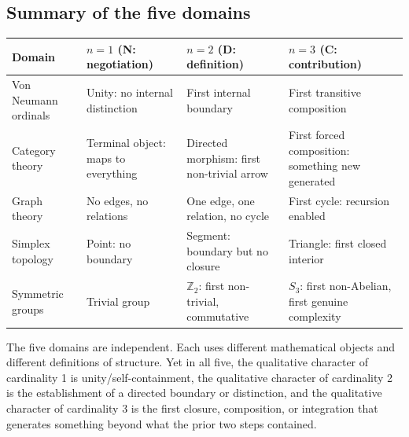 \documentclass[12pt]{article}
\begin{document}
\subsection{Summary of the five domains}\label{summary-of-the-five-domains}

\begin{longtable}[]{@{}
  >{\raggedright\arraybackslash}p{}
  >{\raggedright\arraybackslash}p{}
  >{\raggedright\arraybackslash}p{}
  >{\raggedright\arraybackslash}p{}@{}}
\toprule\noalign{}
\begin{minipage}[b]{\linewidth}\raggedright
Domain
\end{minipage} & \begin{minipage}[b]{\linewidth}\raggedright
\(n = 1\) (N: negotiation)
\end{minipage} & \begin{minipage}[b]{\linewidth}\raggedright
\(n = 2\) (D: definition)
\end{minipage} & \begin{minipage}[b]{\linewidth}\raggedright
\(n = 3\) (C: contribution)
\end{minipage} \\
\midrule\noalign{}
\endhead
\bottomrule\noalign{}
\endlastfoot
Von Neumann ordinals & Unity: no internal distinction & First internal
boundary & First transitive composition \\
Category theory & Terminal object: maps to everything & Directed
morphism: first non-trivial arrow & First forced composition: something
new generated \\
Graph theory & No edges, no relations & One edge, one relation, no cycle
& First cycle: recursion enabled \\
Simplex topology & Point: no boundary & Segment: boundary but no closure
& Triangle: first closed interior \\
Symmetric groups & Trivial group & \(\mathbb{Z}_2\): first non-trivial,
commutative & \(S_3\): first non-Abelian, first genuine complexity \\
\end{longtable}

The five domains are independent. Each uses different mathematical
objects and different definitions of structure. Yet in all five, the
qualitative character of cardinality 1 is unity/self-containment, the
qualitative character of cardinality 2 is the establishment of a
directed boundary or distinction, and the qualitative character of
cardinality 3 is the first closure, composition, or integration that
generates something beyond what the prior two steps contained.
\end{document}
